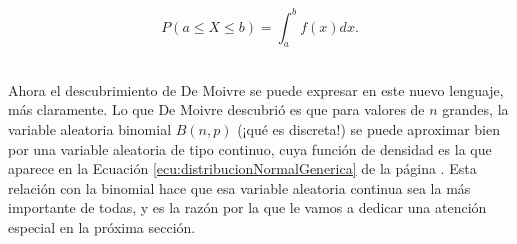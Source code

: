 \begin{itemize}
{{\begin{minipage}{14cm}
\begin{itemize}
           \[P(a\leq X\leq b)=\int_a^b f(x)dx.\]
           \end{itemize}
           \end{minipage}}}\\[3mm]
        Ahora el descubrimiento de De Moivre se puede expresar en este nuevo lenguaje, más claramente. Lo que De Moivre descubrió es que para valores de $n$ grandes, la variable aleatoria binomial $B(n,p)$ (¡qué es discreta!) se puede aproximar bien por una variable aleatoria de tipo continuo, cuya función de densidad es la que aparece en la Ecuación \ref{ecu:distribucionNormalGenerica} de la página \pageref{ecu:distribucionNormalGenerica}. Esta relación con la binomial hace que esa variable aleatoria continua sea la más importante de todas, y es la razón por la que le vamos a dedicar una atención especial en la próxima sección.
\end{itemize}


